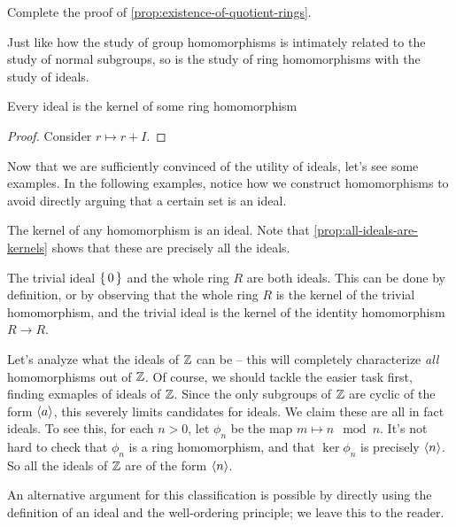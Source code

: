 \documentclass[./main.tex]{subfiles}
\begin{document}
\begin{exercise}
    Complete the proof of \cref{prop:existence-of-quotient-rings}.
\end{exercise}

Just like how the study of group homomorphisms is intimately related to the
study of normal subgroups, so is the study of ring homomorphisms with the study
of ideals.

\begin{proposition}
\label{prop:all-ideals-are-kernels}
    Every ideal is the kernel of some ring homomorphism
\end{proposition}
\begin{proof}
    Consider $r \mapsto r + I$.
\end{proof}

Now that we are sufficiently convinced of the utility of ideals, let's see some
examples. In the following examples, notice how we construct homomorphisms to
avoid directly arguing that a certain set is an ideal.

\begin{example}
    The kernel of any homomorphism is an ideal. Note that
    \cref{prop:all-ideals-are-kernels} shows that these are precisely all the
    ideals. 
\end{example}

\begin{example}
    The trivial ideal $\set{0}$ and the whole ring $R$ are both ideals. This can
    be done by definition, or by observing that the whole ring $R$ is the kernel
    of the trivial homomorphism, and the trivial ideal is the kernel of the
    identity homomorphism $R \to R$.
\end{example}

\begin{example}
    Let's analyze what the ideals of $\mathbb{Z}$ can be -- this will completely
    characterize \emph{all} homomorphisms out of $\mathbb{Z}$. Of course, we should
    tackle the easier task first, finding exmaples of ideals of $\mathbb{Z}$. Since the
    only subgroups of $\mathbb{Z}$ are cyclic of the form ${ \langle a \rangle }$, this severely
    limits candidates for ideals. We claim these are all in fact ideals. To see
    this, for each $n > 0$, let $\phi_n$ be the map $m \mapsto n \mod n$. It's
    not hard to check that $\phi_n$ is a ring homomorphism, and that $\ker
    \phi_n$ is precisely ${ \langle n \rangle }$. So all the ideals of $\mathbb{Z}$ are of the form
    ${ \langle n \rangle }$.
    
    An alternative argument for this classification is possible by directly
    using the definition of an ideal and the well-ordering principle; we leave
    this to the reader.
\end{example}
\end{document}
